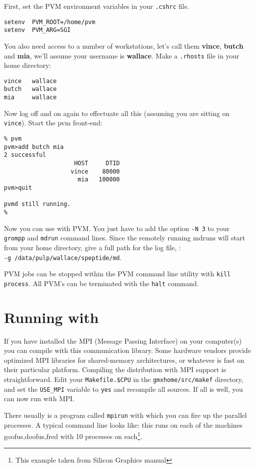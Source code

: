 First, set the PVM environment variables in your {\tt .cshrc} file.
\begin{verbatim}
setenv	PVM_ROOT=/home/pvm
setenv	PVM_ARG=SGI
\end{verbatim}
You also need access to a number of workstations, let's call them
{\bf vince}, {\bf butch} and {\bf mia}, we'll assume your username
is {\bf wallace}. Make a {\tt .rhosts} file in your home directory:
\begin{verbatim}
vince   wallace
butch   wallace
mia     wallace
\end{verbatim}
Now log off and on again to effectuate all this (assuming you are sitting on 
{\tt vince}). Start the pvm front-end: 
\begin{verbatim}
% pvm
pvm>add butch mia
2 successful
                    HOST     DTID
                   vince    80000
                     mia   100000
pvm>quit

pvmd still running.
%
\end{verbatim}
Now you can use {\gromacs} with PVM. You just have to add the option
{\tt -N 3} to your {\tt grompp} and {\tt mdrun} command lines. Since the
remotely running mdruns will start from your home directory, give a full 
path for the log file, {\eg}:\\
{\tt -g /data/pulp/wallace/speptide/md}.

PVM jobs can be stopped within the PVM command line utility with
{\tt kill process}. All PVM's can be terminated with the {\tt halt} command.

\section{Running with }
If you have installed the MPI (Message Passing Interface) on your computer(s)
you can compile {\gromacs} with this communication library. Some
hardware vendors provide optimized MPI libraries for shared-memory
architectures, or whatever is fast on their particular platform.
Compiling the {\gromacs} distribution with MPI support is straightforward.
Edit your {\tt Makefile.\$CPU} in the {\tt gmxhome/src/makef} directory,
and set the {\tt USE\_MPI} variable to {\tt yes} and recompile all sources.
If all is well, you can now run with MPI. 

There usually is a program called {\tt mpirun} with which you can fire
up the parallel processes. A typical command line looks like:
this runs on each of the machines goofus,doofus,fred with 10 processes
on each\footnote{This example taken from Silicon Graphics manual}.

